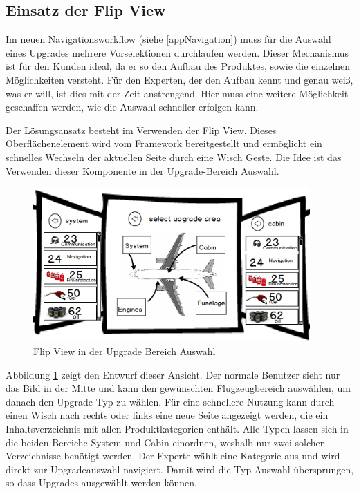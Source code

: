 \subsection{Einsatz der Flip View}
Im neuen Navigationsworkflow (siehe \ref{appNavigation}) muss für die Auswahl eines Upgrades mehrere Vorselektionen durchlaufen werden. Dieser Mechanismus ist für den Kunden ideal, da er so den Aufbau des Produktes, sowie die einzelnen Möglichkeiten versteht. Für den Experten, der den Aufbau kennt und genau weiß, was er will, ist dies mit der Zeit anstrengend. Hier muss eine weitere Möglichkeit geschaffen werden, wie die Auswahl schneller erfolgen kann. \par 

Der Lösungsansatz besteht im Verwenden der Flip View. Dieses Oberflächenelement wird vom Framework bereitgestellt und ermöglicht ein schnelles Wechseln der aktuellen Seite durch eine Wisch Geste. Die Idee ist das Verwenden dieser Komponente in der Upgrade-Bereich Auswahl. 
\begin{figure}
\centering
\includegraphics[width=400px]{images/flipView}
\caption{Flip View in der Upgrade Bereich Auswahl}
\label{flip}
\end{figure}
Abbildung \ref{flip} zeigt den Entwurf dieser Ansicht. Der normale Benutzer sieht nur das Bild in der Mitte und kann den gewünschten Flugzeugbereich auswählen, um danach den Upgrade-Typ zu wählen. Für eine schnellere Nutzung kann durch einen Wisch nach rechts oder links eine neue Seite angezeigt werden, die ein Inhaltsverzeichnis mit allen Produktkategorien enthält. Alle Typen lassen sich in die beiden Bereiche System und Cabin einordnen, weshalb nur zwei solcher Verzeichnisse benötigt werden. Der Experte wählt eine Kategorie aus und wird direkt zur Upgradeauswahl navigiert. Damit wird die Typ Auswahl übersprungen, so dass  Upgrades ausgewählt werden können.

